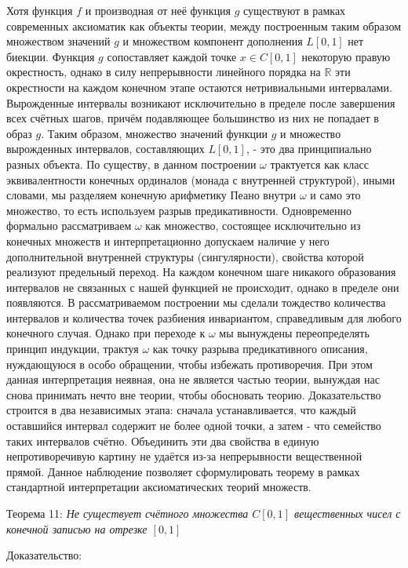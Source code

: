 \documentclass[12pt]{article}
\begin{document}
Хотя функция $f$ и производная от неё функция $g$ существуют в рамках современных аксиоматик как объекты теории, между построенным таким образом множеством значений $g$ и множеством компонент дополнения $L[0, 1]$ нет биекции. Функция $g$ сопоставляет каждой точке $x \in C[0, 1]$ некоторую правую окрестность, однако в силу непрерывности линейного порядка на $\mathbb{R}$ эти окрестности на каждом конечном этапе остаются нетривиальными интервалами. Вырожденные интервалы возникают исключительно в пределе после завершения всех счётных шагов, причём подавляющее большинство из них не попадает в образ $g$. Таким образом, множество значений функции $g$ и множество вырожденных интервалов, составляющих $L[0, 1]$, - это два принципиально разных объекта. По существу, в данном построении $\omega$ трактуется как класс эквивалентности конечных ординалов (монада с внутренней структурой), иными словами, мы разделяем конечную арифметику Пеано внутри $\omega$ и само это множество, то есть используем разрыв предикативности. Одновременно формально рассматриваем $\omega$ как множество, состоящее исключительно из конечных множеств и интерпретационно допускаем наличие у него дополнительной внутренней структуры (сингулярности), свойства которой реализуют предельный переход. На каждом конечном шаге никакого образования интервалов не связанных с нашей функцией не происходит, однако в пределе они появляются. В рассматриваемом построении мы сделали тождество количества интервалов и количества точек разбиения инвариантом, справедливым для любого конечного случая. Однако при переходе к $\omega$ мы вынуждены переопределять принцип индукции, трактуя $\omega$ как точку разрыва предикативного описания, нуждающуюся в особо обращении, чтобы избежать противоречия. При этом данная интерпретация неявная, она не является частью теории, вынуждая нас снова принимать нечто вне теории, чтобы обосновать теорию. Доказательство строится в два независимых этапа: сначала устанавливается, что каждый оставшийся интервал содержит не более одной точки, а затем - что семейство таких интервалов счётно. Объединить эти два свойства в единую непротиворечивую картину не удаётся из-за непрерывности вещественной прямой. Данное наблюдение позволяет сформулировать теорему в рамках стандартной интерпретации аксиоматических теорий множеств.

Теорема 11: {\sl Не существует счётного множества $C[0, 1]$ вещественных чисел с конечной записью на отрезке $[0, 1]$}

Доказательство:
\end{document}
